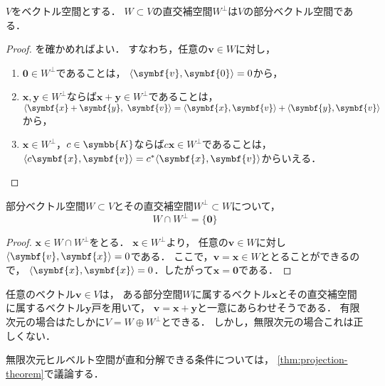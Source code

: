 \documentclass[../sotsu.tex]{subfiles}
\begin{document}
\begin{corollary}
    $V$をベクトル空間とする．
    $W \subset V$の直交補空間$W^\perp$は$V$の部分ベクトル空間である．
\end{corollary}

\begin{proof}
    を確かめればよい．
    すなわち，任意の$\symbf{v} \in W$に対し，
    \begin{enumerate}
        \item $\symbf{0} \in W^\perp$であることは，
            $\iparen{\symbf{v}, \symbf{0}} = 0$から，
        \item $\symbf{x}, \symbf{y} \in W^\perp$ならば$\symbf{x} + \symbf{y} \in W^\perp$であることは，
            $\iparen{\symbf{x} + \symbf{y}, \  \symbf{v}} = \iparen{\symbf{x}, \symbf{v}} + \iparen{\symbf{y}, \symbf{v}}$から，
        \item $\symbf{x} \in W^\perp$，$c \in \symbb{K}$ならば$c\symbf{x} \in W^\perp$であることは，
            $\iparen{c\symbf{x}, \symbf{v}} = \conj{c} \iparen{\symbf{x}, \symbf{v}}$からいえる．
    \end{enumerate}
\end{proof}


\begin{corollary}
    部分ベクトル空間$W \subset V$とその直交補空間$W^\perp \subset W$について，
    \[  W \cap W^\perp = \{ \symbf{0} \}  \]
\end{corollary}

\begin{proof}
    $\symbf{x} \in W \cap W^\perp$をとる．
    $\symbf{x} \in W^\perp$より，
    任意の$\symbf{v} \in W$に対し$\iparen{\symbf{v}, \symbf{x}} = 0$である．
    ここで，$\symbf{v} = \symbf{x} \in W$ととることができるので，
    $\iparen{\symbf{x}, \symbf{x}} = 0$．したがって$\symbf{x} = \symbf{0}$である．
\end{proof}

任意のベクトル$\symbf{v} \in V$は，
ある部分空間$W$に属するベクトル$\symbf{x}$とその直交補空間に属するベクトル$\symbf{y}$戸を用いて，
$\symbf{v} = \symbf{x} + \symbf{y}$と一意にあらわせそうである．
有限次元の場合はたしかに$V = W \oplus W^\perp$とできる．
しかし，無限次元の場合これは正しくない．

無限次元ヒルベルト空間が直和分解できる条件については，
\cref{thm:projection-theorem}で議論する．
\end{document}
